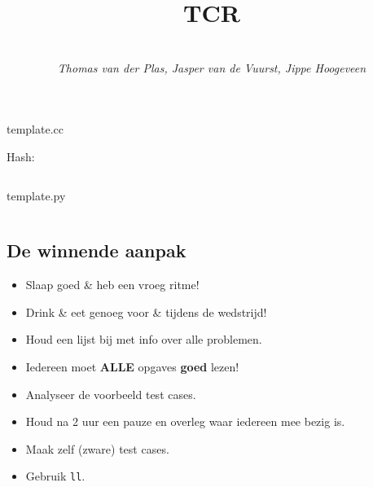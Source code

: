 \documentclass[9pt,a4paper,landscape,oneside]{amsart}
\title{TCR}
\subtitle{\textbf{\QQ} \\ \textit{Thomas van der Plas, Jasper van de Vuurst, Jippe Hoogeveen}}
\newcommand{\mintedstyle}[2]{\inputminted{#1}{code/#2}}
\newcommand{\code}[1]{ Hash: 
\mintedstyle{cpp}{#1}}
\newenvironment{myitemize}
{\begin{itemize}[leftmargin=.3cm]
	\setlength{\itemsep}{0pt}
	\setlength{\parskip}{0pt}
	\setlength{\parsep}{0pt}     }
{ \end{itemize}                  }
\begin{document}
\begin{multicols*}{3}
\maketitle
\begin{comment}
\begin{center}
	\makeatletter
	\textbf{\@title} \\
	\emph{\@author}
	\makeatother
\end{center}
\end{comment}


\tableofcontents

\vfill\null \columnbreak




\begin{center}
template.cc
\end{center}

\code{template.cpp}

\begin{center}
template.py
\end{center}

\mintedstyle{python}{python.py}

\subsection{De winnende aanpak}

\begin{myitemize}
	\item Slaap goed \& heb een vroeg ritme!
	\item Drink \& eet genoeg voor \& tijdens de wedstrijd!
	\item Houd een lijst bij met info over alle problemen.
	\item Iedereen moet {\huge\textbf{ALLE}} opgaves \textbf{goed} lezen!
	\item Analyseer de voorbeeld test cases.
	\item Houd na 2 uur een pauze en overleg waar iedereen mee bezig is.
	\item Maak zelf (zware) test cases.
	\item Gebruik \texttt{ll}.
\end{myitemize}


\end{multicols*}
\end{document}
